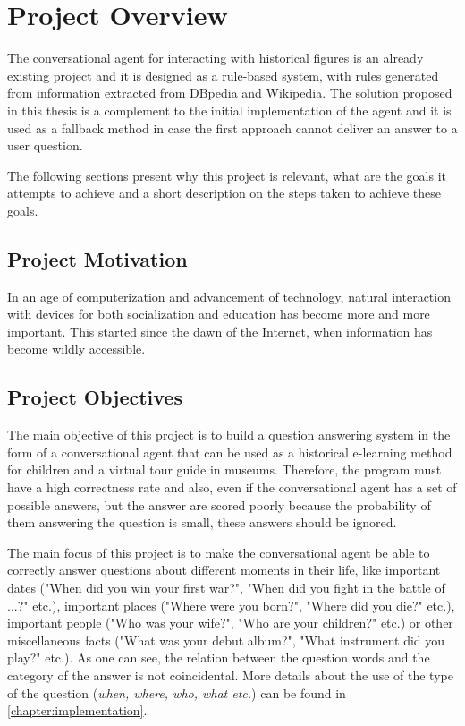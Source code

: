 \chapter{Project Overview}
\label{chapter:project}

The conversational agent for interacting with historical figures is an already existing project and it is designed as a rule-based system, with rules generated from information extracted from DBpedia and Wikipedia. The solution proposed in this thesis is a complement to the initial implementation of the agent and it is used as a fallback method in case the first approach cannot deliver an answer to a user question.

The following sections present why this project is relevant, what are the goals it attempts to achieve and a short description on the steps taken to achieve these goals.

\section{Project Motivation}
\label{sec:project-motivation}

In an age of computerization and advancement of technology, natural interaction with devices for both socialization and education has become more and more important. This started since the dawn of the Internet, when information has become wildly accessible.

\section{Project Objectives}
\label{sec:project-objectives}

The main objective of this project is to build a question answering system in the form of a conversational agent that can be used as a historical e-learning method for children and a virtual tour guide in museums. Therefore, the program must have a high correctness rate and also, even if the conversational agent has a set of possible answers, but the answer are scored poorly because the probability of them answering the question is small, these answers should be ignored.

The main focus of this project is to make the conversational agent be able to correctly answer questions about different moments in their life, like important dates ("When did you win your first war?", "When did you fight in the battle of ...?" etc.), important places ("Where were you born?", "Where did you die?" etc.), important people ("Who was your wife?", "Who are your children?" etc.) or other miscellaneous facts ("What was your debut album?", "What instrument did you play?" etc.). As one can see, the relation between the question words and the category of the answer is not coincidental. More details about the use of the type of the question ({\em when, where, who, what etc.}) can be found in \autoref{chapter:implementation}.

